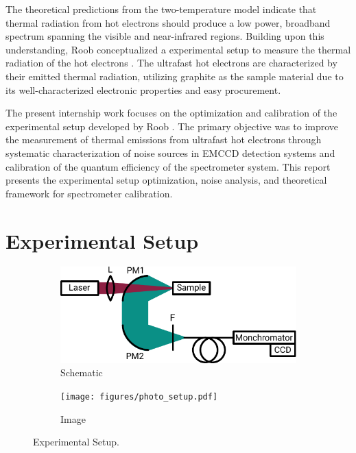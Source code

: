 \documentclass[
	parskip=half,
	a4paper,
]{scrarticle}
\begin{document}
The theoretical predictions from the two-temperature model indicate that thermal radiation from hot electrons should produce a low power, broadband spectrum spanning the visible and near-infrared regions. Building upon this understanding, Roob conceptualized a experimental setup to measure the thermal radiation of the hot electrons \cite{roob_thermal_2025}. The ultrafast hot electrons are characterized by their emitted thermal radiation, utilizing graphite as the sample material due to its well-characterized electronic properties \cite{nihira_temperature_2003} and easy procurement.

The present internship work focuses on the optimization and calibration of the experimental setup developed by Roob \cite{roob_thermal_2025}. The primary objective was to improve the measurement of thermal emissions from ultrafast hot electrons through systematic characterization of noise sources in EMCCD detection systems \cite{andor_establishing_nodate, dr_jo_walters_sensitivity_2023} and calibration of the quantum efficiency of the spectrometer system. 
This report presents the experimental setup optimization, noise analysis, and theoretical framework for spectrometer calibration.

\section{Experimental Setup}

\begin{figure}
    \centering
     \begin{subfigure}{3.5in}
        \centering
        \includegraphics{figures/setup.pdf}
        \caption{Schematic}
    \end{subfigure}
    \hfill
    \begin{subfigure}{2in}
        \centering
        \texttt{[image: figures/photo\_setup.pdf]}
        \caption{Image}
    \end{subfigure}
    \caption{Experimental Setup.}
    \label{fig:setup}
\end{figure}
\end{document}
